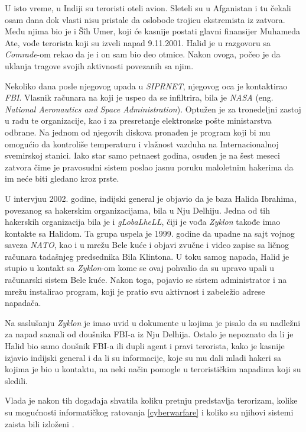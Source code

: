\documentclass[a4paper]{article}
\begin{document}
U isto vreme, u Indiji su teroristi oteli avion. Sleteli su u Afganistan i tu čekali osam dana dok vlasti nisu pristale da oslobode trojicu ekstremista iz zatvora. Među njima bio je i Šîh Umer, koji će kasnije postati glavni finansijer Muhameda Ate, vođe terorista koji su izveli napad 9.11.2001. Halid je u razgovoru sa \textit{Comrade}-om rekao da je i on sam bio deo otmice. Nakon ovoga, počeo je da uklanja tragove svojih aktivnosti povezanih sa njim.

Nekoliko dana posle njegovog upada u \textit{SIPRNET}, njegovog oca je kontaktirao \textit{FBI}. Vlasnik računara na koji je uspeo da se infiltrira, bila je \textit{NASA} (eng. \textit{National Aeronautics and Space Administration}). Optužen je za tronedeljni 
zastoj u radu te organizacije, kao i za presretanje 
elektronske pošte ministarstva odbrane. Na jednom od 
njegovih diskova pronađen je program koji bi mu 
omogućio da kontroliše temperaturu i vlažnost vazduha 
na Internacionalnoj svemirskoj stanici. Iako star samo petnaest godina, osuđen je na šest meseci zatvora čime je pravosudni sistem poslao jasnu poruku maloletnim hakerima da im neće biti gledano kroz prste.

U intervjuu 2002. godine, indijski general je objavio da je baza Halida Ibrahima, povezanog sa hakerskim organizacijama, bila u Nju Delhiju. Jedna od tih hakerskih organizacija bila je i \textit{gLobaLheLL}, čiji je vođa \textit{Zyklon} takođe imao kontakte sa Halidom. Ta grupa uspela je 1999. godine da upadne na sajt vojnog saveza \textit{NATO}, kao i u mrežu Bele kuće i objavi zvučne i video zapise sa ličnog računara tadašnjeg predsednika Bila Klintona. U toku samog napada, Halid je stupio u kontakt sa \textit{Zyklon}-om kome se ovaj pohvalio da su upravo upali u računarski sistem Bele kuće. Nakon toga, pojavio se sistem administrator i na mrežu instalirao program, koji je pratio svu aktivnost i zabeležio adrese napadača.

Na saslušanju \textit{Zyklon} je imao uvid u dokumente u kojima je pisalo da su nadležni za napad saznali od doušnika FBI-a iz Nju Delhija. Ostalo je nepoznato da li je Halid bio samo doušnik FBI-a ili dupli agent i pravi terorista, kako je kasnije izjavio indijski general i da li su informacije, koje su mu dali mladi hakeri sa kojima je bio u kontaktu, na neki način pomogle u terorističkim napadima koji su sledili. 

Vlada je nakon tih događaja shvatila koliku pretnju predstavlja terorizam, kolike su mogućnosti informatičkog ratovanja \ref{cyberwarfare} i koliko su njihovi sistemi zaista bili izloženi \cite{intrusion}.
\end{document}
